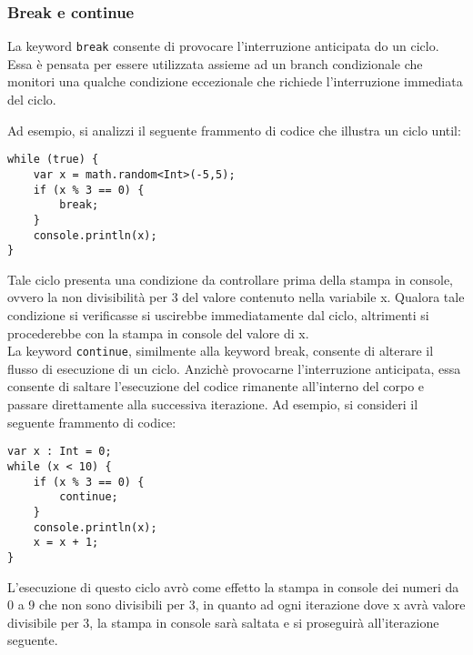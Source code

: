 \subsubsection{Break e continue}
La keyword \texttt{break} consente di provocare l’interruzione anticipata do un ciclo. Essa è pensata per essere utilizzata assieme ad un branch condizionale 
che monitori una qualche condizione eccezionale che richiede l’interruzione immediata del ciclo.

Ad esempio, si analizzi il seguente frammento di codice che illustra un ciclo until:

\vspace{0.5cm}
\begin{lstlisting}[frame=single]
while (true) {
    var x = math.random<Int>(-5,5);
    if (x % 3 == 0) {
        break;
    }
    console.println(x);
}
\end{lstlisting}
\vspace{0.5cm}

Tale ciclo presenta una condizione da controllare prima della stampa in console, ovvero la non divisibilità per 3 del valore contenuto nella variabile x. 
Qualora tale condizione si verificasse si uscirebbe immediatamente dal ciclo, altrimenti si procederebbe con la stampa in console del valore di x. \\

La keyword \texttt{continue}, similmente alla keyword break, consente di alterare il flusso di esecuzione di un ciclo. Anzichè provocarne 
l’interruzione anticipata, essa consente di saltare l’esecuzione del codice rimanente all’interno del corpo e passare direttamente alla 
successiva iterazione. Ad esempio, si consideri il seguente frammento di codice:

\vspace{0.5cm}
\begin{lstlisting}[frame=single]
var x : Int = 0;
while (x < 10) {
    if (x % 3 == 0) {
        continue;
    }
    console.println(x);
    x = x + 1;
}
\end{lstlisting}
\vspace{0.5cm}

L’esecuzione di questo ciclo avrò come effetto la stampa in console dei numeri da 0 a 9 che non sono divisibili per 3, 
in quanto ad ogni iterazione dove x avrà valore divisibile per 3,  la stampa in console sarà saltata e si 
proseguirà all’iterazione seguente.